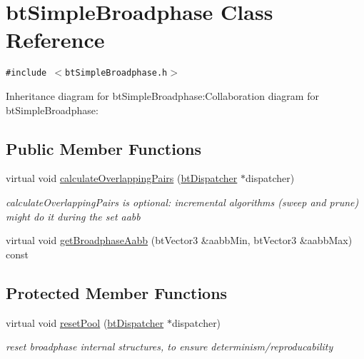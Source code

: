 \hypertarget{classbt_simple_broadphase}{
\section{btSimpleBroadphase Class Reference}
\label{classbt_simple_broadphase}
}
{\tt \#include $<$btSimpleBroadphase.h$>$}

Inheritance diagram for btSimpleBroadphase:Collaboration diagram for btSimpleBroadphase:\subsection*{Public Member Functions}
\begin{CompactItemize}
\item 
\hypertarget{classbt_simple_broadphase_c899d483e888fa132677125c88991de8}{
virtual void \hyperlink{classbt_simple_broadphase_c899d483e888fa132677125c88991de8}{calculateOverlappingPairs} (\hyperlink{classbt_dispatcher}{btDispatcher} $\ast$dispatcher)}
\label{classbt_simple_broadphase_c899d483e888fa132677125c88991de8}

\begin{CompactList}\small\item\em calculateOverlappingPairs is optional: incremental algorithms (sweep and prune) might do it during the set aabb \item\end{CompactList}\item 
virtual void \hyperlink{classbt_simple_broadphase_8753363773ebbfeb48f8cf5594429dc2}{getBroadphaseAabb} (btVector3 \&aabbMin, btVector3 \&aabbMax) const 
\end{CompactItemize}
\subsection*{Protected Member Functions}
\begin{CompactItemize}
\item 
\hypertarget{classbt_simple_broadphase_65c387ba0fa8690716296ee9d5f7550a}{
virtual void \hyperlink{classbt_simple_broadphase_65c387ba0fa8690716296ee9d5f7550a}{resetPool} (\hyperlink{classbt_dispatcher}{btDispatcher} $\ast$dispatcher)}
\label{classbt_simple_broadphase_65c387ba0fa8690716296ee9d5f7550a}

\begin{CompactList}\small\item\em reset broadphase internal structures, to ensure determinism/reproducability \item\end{CompactList}\end{CompactItemize}


